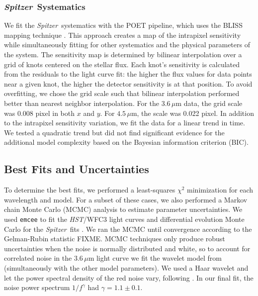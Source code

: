 \documentclass[twocolumn]{aastex61}
\newcommand{\project}[1]{\textsl{#1}}
\newcommand{\HST}{\project{HST}}
\newcommand{\Spitzer}{\project{Spitzer}}
\begin{document}
\subsubsection{\Spitzer\ Systematics}
We fit the \Spitzer\ systematics with the POET pipeline, which uses the BLISS mapping technique \citep{stevenson12}. This approach creates a map of the intrapixel sensitivity while simultaneously fitting for other systematics and the physical parameters of the system. The sensitivity map is determined by bilinear interpolation over a grid of knots centered on the stellar flux. Each knot's sensitivity is calculated from the residuals to the light curve fit: the higher the flux values for data points near a given knot, the higher the detector sensitivity is at that position.  To avoid overfitting, we chose the grid scale such that bilinear interpolation performed better than nearest neighbor interpolation. For the $3.6\,\mu$m data, the grid scale was 0.008 pixel in both $x$ and $y$. For $4.5\,\mu$m, the scale was 0.022 pixel.  In addition to the intrapixel sensitivity variation, we fit the data for a linear trend in time. We tested a quadratic trend but did not find significant evidence for the additional model complexity based on the Bayesian information criterion (BIC). 


\subsection{Best Fits and Uncertainties}
To determine the best fits, we performed a least-squares $\chi^2$ minimization for each wavelength and model. For a subset of these cases, we also performed a Markov chain Monte Carlo (MCMC) analysis to estimate parameter uncertainties. We used \texttt{emcee} \citep{foremanmackey13} to fit the \HST/WFC3 light curves and differential evolution Monte Carlo for the \Spitzer\ fits \citep{braak06}. We ran the MCMC until convergence according to the Gelman-Rubin statistic FIXME. MCMC techniques only produce robust uncertainties when the noise is normally distributed and white, so to account for correlated noise in the $3.6\,\mu$m light curve we fit the wavelet model from \cite{carter09} (simultaneously with the other model parameters). We used a Haar wavelet and let the power spectral density of the red noise vary, following \cite{diamond-lowe14}. In our final fit, the noise power spectrum $1/f^\gamma$ had $\gamma = 1.1 \pm 0.1$.  
\end{document}

